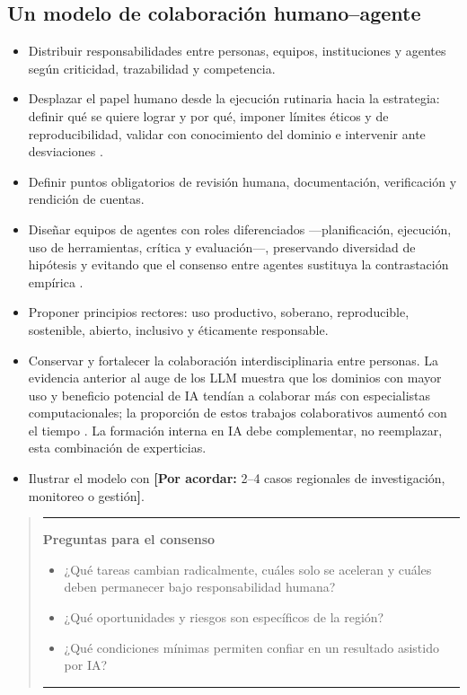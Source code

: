 \documentclass[11pt,a4paper]{article}
\newcommand{\pendiente}[1]{\textcolor{azulieb}{\textbf{[Por acordar:} #1\textbf{]}}}
\newenvironment{preguntas}
  {\par\medskip\begin{quote}\color{azulieb}\hrule\smallskip
   \textbf{Preguntas para el consenso}\par\smallskip\begin{itemize}}
  {\end{itemize}\smallskip\hrule\end{quote}\par\medskip}
\begin{document}
\subsection{Un modelo de colaboración humano--agente}

\begin{itemize}
  \item Distribuir responsabilidades entre personas, equipos, instituciones y
  agentes según criticidad, trazabilidad y competencia.
  \item Desplazar el papel humano desde la ejecución rutinaria hacia la estrategia:
  definir qué se quiere lograr y por qué, imponer límites éticos y de
  reproducibilidad, validar con conocimiento del dominio e intervenir ante
  desviaciones \citep{wei2025agentic,wang2026five}.
  \item Definir puntos obligatorios de revisión humana, documentación,
  verificación y rendición de cuentas.
  \item Diseñar equipos de agentes con roles diferenciados ---planificación,
  ejecución, uso de herramientas, crítica y evaluación---, preservando diversidad
  de hipótesis y evitando que el consenso entre agentes sustituya la contrastación
  empírica \citep{boiko2023autonomous,wei2025agentic}.
  \item Proponer principios rectores: uso productivo, soberano, reproducible,
  sostenible, abierto, inclusivo y éticamente responsable.
  \item Conservar y fortalecer la colaboración interdisciplinaria entre personas.
  La evidencia anterior al auge de los LLM muestra que los dominios con mayor uso
  y beneficio potencial de IA tendían a colaborar más con especialistas
  computacionales; la proporción de estos trabajos colaborativos aumentó con el
  tiempo \citep{gao2024quantifying}. La formación interna en IA debe complementar,
  no reemplazar, esta combinación de experticias.
  \item Ilustrar el modelo con \pendiente{2--4 casos regionales de investigación,
  monitoreo o gestión}.
\end{itemize}

\begin{preguntas}
  \item ¿Qué tareas cambian radicalmente, cuáles solo se aceleran y cuáles deben
  permanecer bajo responsabilidad humana?
  \item ¿Qué oportunidades y riesgos son específicos de la región?
  \item ¿Qué condiciones mínimas permiten confiar en un resultado asistido por IA?
\end{preguntas}
\end{document}
